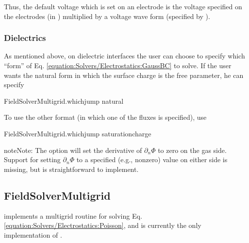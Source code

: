 \documentclass[letterpaper,10pt,english]{sphinxmanual}
\begin{document}
\sphinxAtStartPar
Thus, the default voltage which is set on an electrode is the voltage  specified on the electrodes (in ) multiplied by a voltage wave form (specified by ).


\subsubsection{Dielectrics}
\label{\detokenize{Solvers/Electrostatics:dielectrics}}\label{\detokenize{Solvers/Electrostatics:chap-poissondielectricbc}}
\sphinxAtStartPar
As mentioned above, on dielectric interfaces the user can choose to specify which “form” of Eq. \ref{equation:Solvers/Electrostatics:GaussBC} to solve.
If the user wants the natural form in which the surface charge is the free parameter, he can specify

\begin{sphinxVerbatim}[commandchars=\\\{\},formatcom=\scriptsize]
FieldSolverMultigrid.which\PYGZus{}jump  natural
\end{sphinxVerbatim}

\sphinxAtStartPar
To use the other format (in which one of the fluxes is specified), use

\begin{sphinxVerbatim}[commandchars=\\\{\},formatcom=\scriptsize]
FieldSolverMultigrid.which\PYGZus{}jump  saturation\PYGZus{}charge
\end{sphinxVerbatim}

\begin{sphinxadmonition}{note}{Note:}
\sphinxAtStartPar
The  option will set the derivative of \(\partial_n\Phi\) to zero on the gas side.
Support for setting \(\partial_n\Phi\) to a specified (e.g., non\sphinxhyphen{}zero) value on either side is missing, but is straightforward to implement.
\end{sphinxadmonition}


\subsection{FieldSolverMultigrid}
\label{\detokenize{Solvers/Electrostatics:fieldsolvermultigrid}}\label{\detokenize{Solvers/Electrostatics:chap-fieldsolvermultigrid}}\label{\detokenize{Solvers/Electrostatics:chap-electrostaticdispersion}}
\sphinxAtStartPar
{} implements a multigrid routine for solving Eq. \ref{equation:Solvers/Electrostatics:Poisson}, and is currently the only implementation of .
\end{document}
